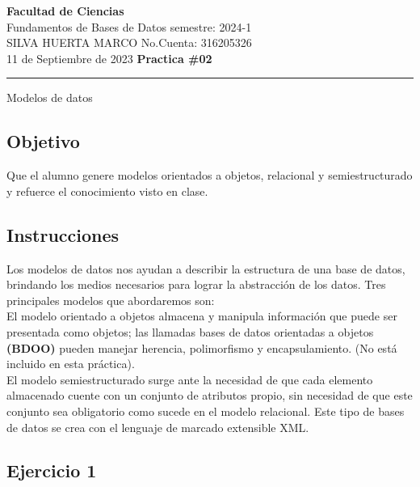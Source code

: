 \documentclass[a4paper,12pt]{article}
\begin{document}
\pagecolor{black}
\color{white}

\thispagestyle{firstpage} %
\noindent
\large\textbf{Facultad de Ciencias} \\
Fundamentos de Bases de Datos \hfill semestre: 2024-1 \\
\textsc{SILVA HUERTA MARCO}   \hfill No.Cuenta: 316205326    \\
11 de Septiembre de 2023      \hfill \textbf{Practica \#02}    \\
\noindent\rule{7.3in}{2.8pt}

\begin{center}
\Large{Modelos de datos}
\end{center}

\subsection*{Objetivo}
Que el alumno genere modelos orientados a objetos, relacional y semiestructurado y
refuerce el conocimiento visto en clase.

\subsection*{Instrucciones}

Los modelos de datos nos ayudan a describir la estructura de una base de datos, brindando
los medios necesarios para lograr la abstracción de los datos. Tres principales modelos que
abordaremos son:\\

El modelo orientado a objetos almacena y manipula información que puede ser presentada 
como objetos; las llamadas bases de datos orientadas a objetos \textbf{(BDOO)} pueden manejar
herencia, polimorfismo y encapsulamiento. (No está incluido en esta práctica).\\

El modelo semiestructurado surge ante la necesidad de que cada elemento almacenado
cuente con un conjunto de atributos propio, sin necesidad de que este conjunto sea
obligatorio como sucede en el modelo relacional. Este tipo de bases de datos se crea con el
lenguaje de marcado extensible XML.

\subsection*{Ejercicio 1}
\end{document}
